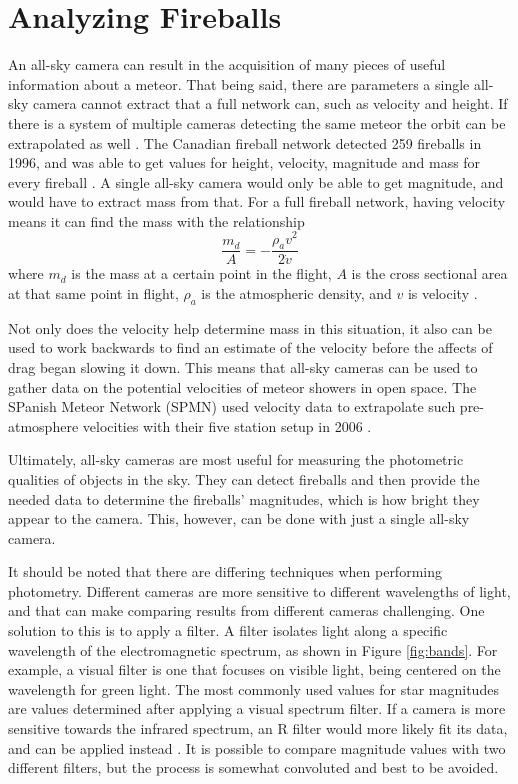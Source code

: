 \section{Analyzing Fireballs}

An all-sky camera can result in the acquisition of many pieces of useful information about a meteor. That being said, there are parameters a single all-sky camera cannot extract that a full network can, such as velocity and height. If there is a system of multiple cameras detecting the same meteor the orbit can be extrapolated as well \cite{Trigo-Rodriguez2009}. The Canadian fireball network detected 259 fireballs in 1996, and was able to get values for height, velocity, magnitude and mass for every fireball \cite{Halliday1996}. A single all-sky camera would only be able to get magnitude, and would have to extract mass from that. For a full fireball network, having velocity means it can find the mass with the relationship
\begin{equation} 
	\label{eq:mass}
	\frac{m_d}{A} = -\frac{\rho_a v^2}{2 \dot v}
\end{equation}
where $m_d$ is the mass at a certain point in the flight, $A$ is the cross sectional area at that same point in flight, $\rho_a$ is the atmospheric density, and $v$ is velocity \cite{Halliday1996}.


Not only does the velocity help determine mass in this situation, it also can be used to work backwards to find an estimate of the velocity before the affects of drag began slowing it down. This means that all-sky cameras can be used to gather data on the potential velocities of meteor showers in open space. The SPanish Meteor Network (SPMN) used velocity data to extrapolate such pre-atmosphere velocities with their five station setup in 2006 \cite{Trigo-Rodriguez2007}. 

Ultimately, all-sky cameras are most useful for measuring the photometric qualities of objects in the sky. They can detect fireballs and then provide the needed data to determine the fireballs' magnitudes, which is how bright they appear to the camera. This, however, can be done with just a single all-sky camera.

It should be noted that there are differing techniques when performing photometry. Different cameras are more sensitive to different wavelengths of light, and that can make comparing results from different cameras challenging. One solution to this is to apply a filter. A filter isolates light along a specific wavelength of the electromagnetic spectrum, as shown in Figure \ref{fig:bands}. For example, a visual filter is one that focuses on visible light, being centered on the wavelength for green light. The most commonly used values for star magnitudes are values determined after applying a visual spectrum filter. If a camera is more sensitive towards the infrared spectrum, an R filter would more likely fit its data, and can be applied instead \cite{Suggs2014}. It is possible to compare magnitude values with two different filters, but the process is somewhat convoluted and best to be avoided.

